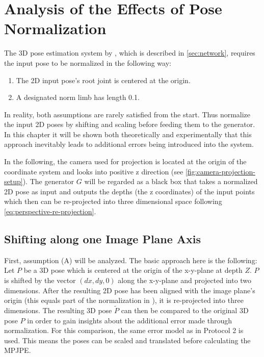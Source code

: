 \section{Analysis of the Effects of Pose Normalization}
\label{sec:effects-of-normalization}

The 3D pose estimation system by \citet{drover18}, which is described in \autoref{sec:network}, requires the input pose to be normalized in the following way:
\begin{enumerate}[label=(\Alph*)]
	\item The 2D input pose's root joint is centered at the origin.
	\item A designated norm limb has length 0.1.
\end{enumerate}

In reality, both assumptions are rarely satisfied from the start.
Thus \citet{drover18} normalize the input 2D poses by shifting and scaling before feeding them to the generator.
In this chapter it will be shown both theoretically and experimentally that this approach inevitably leads to additional errors being introduced into the system.

In the following, the camera used for projection is located at the origin of the coordinate system and looks into positive z direction (see \autoref{fig:camera-projection-setup}).
The generator $G$ will be regarded as a black box that takes a normalized 2D pose as input and outputs the depths (the z coordinates) of the input points which then can be re-projected into three dimensional space following \autoref{eq:perspective-re-projection}.

\subsection{Shifting along one Image Plane Axis}
\label{sec:x-shift-error}
First, assumption (A) will be analyzed.
The basic approach here is the following:
Let $P$ be a 3D pose which is centered at the origin of the x-y-plane at depth $Z$.
$P$ is shifted by the vector $(dx, dy, 0)$ along the x-y-plane and projected into two dimensions.
After the resulting 2D pose has been aligned with the image plane's origin (this equals part of the normalization in \cite{drover18}), it is re-projected into three dimensions.
The resulting 3D pose $\widetilde{P}$ can then be compared to the original 3D pose $P$ in order to gain insights about the additional error made through normalization.
For this comparison, the same error model as in Protocol 2 is used.
This means the poses can be scaled and translated before calculating the MPJPE.

